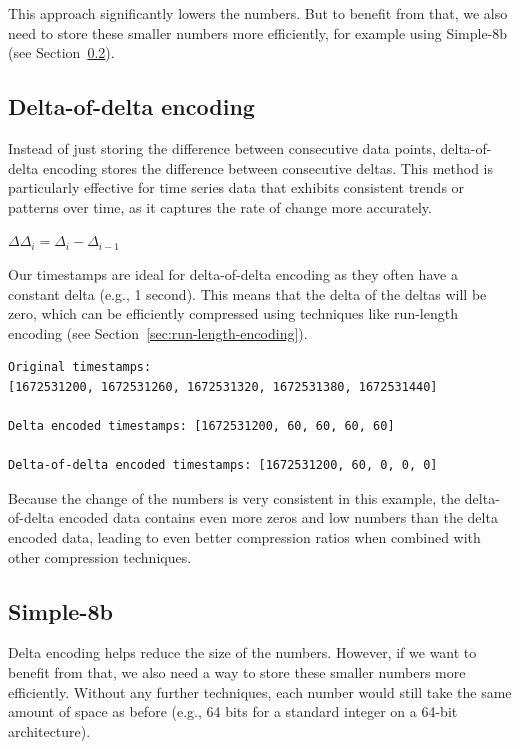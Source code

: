 This approach significantly lowers the numbers. But to benefit from that, we
also need to store these smaller numbers more efficiently, for example using
Simple-8b (see Section~\ref{sec:simple-8b}).

\subsection{Delta-of-delta encoding}\label{sec:delta-of-delta}

Instead of just storing the difference between consecutive data points,
delta-of-delta encoding stores the difference between consecutive deltas. This
method is particularly effective for time series data that exhibits consistent
trends or patterns over time, as it captures the rate of change more
accurately.

$\Delta\Delta_i = \Delta_i - \Delta_{i-1}$

Our timestamps are ideal for delta-of-delta encoding as they often have a
constant delta (e.g., 1 second). This means that the delta of the deltas will
be zero, which can be efficiently compressed using techniques like run-length
encoding (see Section~\ref{sec:run-length-encoding}).

\begin{verbatim}
Original timestamps:
[1672531200, 1672531260, 1672531320, 1672531380, 1672531440]

Delta encoded timestamps: [1672531200, 60, 60, 60, 60]

Delta-of-delta encoded timestamps: [1672531200, 60, 0, 0, 0]
\end{verbatim}

Because the change of the numbers is very consistent in this example, the
delta-of-delta encoded data contains even more zeros and low numbers than the
delta encoded data, leading to even better compression ratios when combined
with other compression techniques.

\subsection{Simple-8b}\label{sec:simple-8b}

Delta encoding helps reduce the size of the numbers. However, if we want to
benefit from that, we also need a way to store these smaller numbers more
efficiently. Without any further techniques, each number would still take the
same amount of space as before (e.g., 64 bits for a standard integer on a
64-bit architecture).

